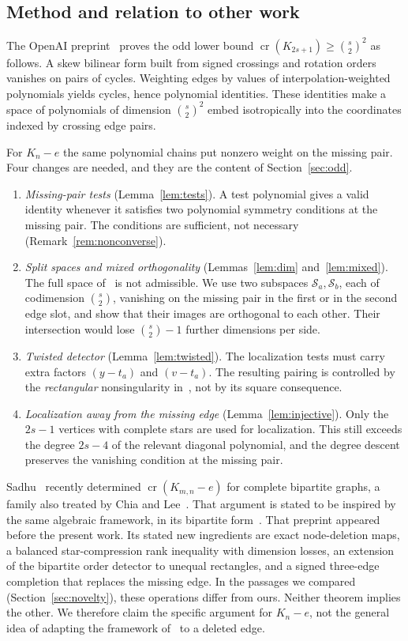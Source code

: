\documentclass[11pt,a4paper]{article}
\theoremstyle{definition}
\theoremstyle{remark}
\numberwithin{equation}{section}
\newcommand{\crn}{\operatorname{cr}}
\newcommand{\SSS}{\mathcal S}
\begin{document}
\subsection{Method and relation to other work}

The OpenAI preprint~\cite{OAIKn} proves the odd lower bound $\crn(K_{2s+1})\ge\binom s2^2$ as follows. A skew bilinear form built from signed crossings and rotation orders vanishes on pairs of cycles. Weighting edges by values of interpolation-weighted polynomials yields cycles, hence polynomial identities. These identities make a space of polynomials of dimension $\binom s2^2$ embed isotropically into the coordinates indexed by crossing edge pairs.

For $K_n-e$ the same polynomial chains put nonzero weight on the missing pair. Four changes are needed, and they are the content of Section~\ref{sec:odd}.
\begin{enumerate}[leftmargin=1.7em,label=(\roman*)]
\item \emph{Missing-pair tests} (Lemma~\ref{lem:tests}). A test polynomial gives a valid identity whenever it satisfies two polynomial symmetry conditions at the missing pair. The conditions are sufficient, not necessary (Remark~\ref{rem:nonconverse}).
\item \emph{Split spaces and mixed orthogonality} (Lemmas~\ref{lem:dim} and~\ref{lem:mixed}). The full space of~\cite{OAIKn} is not admissible. We use two subspaces $\SSS_a,\SSS_b$, each of codimension $\binom s2$, vanishing on the missing pair in the first or in the second edge slot, and show that their images are orthogonal to each other. Their intersection would lose $\binom s2-1$ further dimensions per side.
\item \emph{Twisted detector} (Lemma~\ref{lem:twisted}). The localization tests must carry extra factors $(y-t_a)$ and $(v-t_a)$. The resulting pairing is controlled by the \emph{rectangular} nonsingularity in~\cite[Lemma~3.3]{OAIKn}, not by its square consequence.
\item \emph{Localization away from the missing edge} (Lemma~\ref{lem:injective}). Only the $2s-1$ vertices with complete stars are used for localization. This still exceeds the degree $2s-4$ of the relevant diagonal polynomial, and the degree descent preserves the vanishing condition at the missing pair.
\end{enumerate}

Sadhu~\cite{Sadhu} recently determined $\crn(K_{m,n}-e)$ for complete bipartite graphs, a family also treated by Chia and Lee~\cite{ChiaLee}. That argument is stated to be inspired by the same algebraic framework, in its bipartite form~\cite{OAIKmn}. That preprint appeared before the present work. Its stated new ingredients are exact node-deletion maps, a balanced star-compression rank inequality with dimension losses, an extension of the bipartite order detector to unequal rectangles, and a signed three-edge completion that replaces the missing edge. In the passages we compared (Section~\ref{sec:novelty}), these operations differ from ours. Neither theorem implies the other. We therefore claim the specific argument for $K_n-e$, not the general idea of adapting the framework of~\cite{OAIKn} to a deleted edge.
\end{document}
